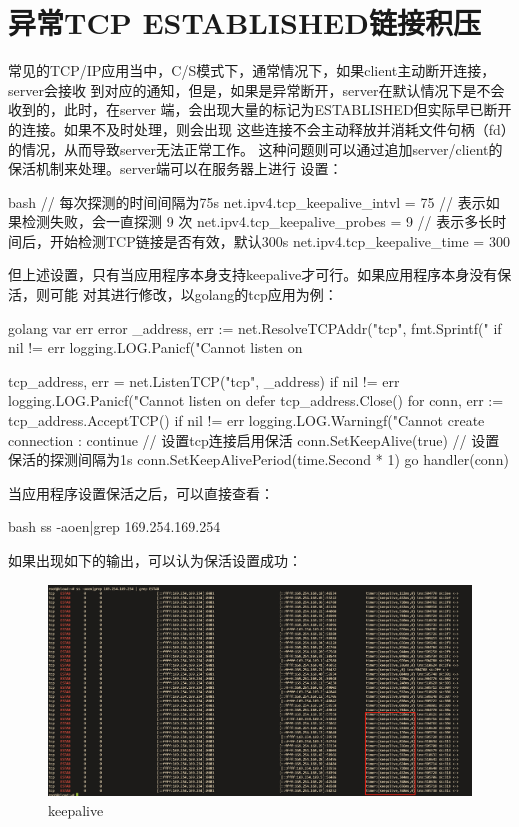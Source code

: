 \section{异常TCP ESTABLISHED链接积压}
常见的TCP/IP应用当中，C/S模式下，通常情况下，如果client主动断开连接，server会接收
到对应的通知，但是，如果是异常断开，server在默认情况下是不会收到的，此时，在server
端，会出现大量的标记为ESTABLISHED但实际早已断开的连接。如果不及时处理，则会出现
这些连接不会主动释放并消耗文件句柄（fd）的情况，从而导致server无法正常工作。
这种问题则可以通过追加server/client的保活机制来处理。server端可以在服务器上进行
设置：
\begin{code-block}{bash}
// 每次探测的时间间隔为75s
net.ipv4.tcp_keepalive_intvl = 75
// 表示如果检测失败，会一直探测 9 次
net.ipv4.tcp_keepalive_probes = 9
// 表示多长时间后，开始检测TCP链接是否有效，默认300s
net.ipv4.tcp_keepalive_time = 300
\end{code-block}
但上述设置，只有当应用程序本身支持keepalive才可行。如果应用程序本身没有保活，则可能
对其进行修改，以golang的tcp应用为例：
\begin{code-block}{golang}
var err error
_address, err := net.ResolveTCPAddr("tcp", fmt.Sprintf("%
if nil != err {
        logging.LOG.Panicf("Cannot listen on %
}

tcp_address, err = net.ListenTCP("tcp", _address)
if nil != err {
        logging.LOG.Panicf("Cannot listen on %
}
defer tcp_address.Close()
for {
        conn, err := tcp_address.AcceptTCP()
        if nil != err {
                logging.LOG.Warningf("Cannot create connection :%
                continue
        }
        // 设置tcp连接启用保活
        conn.SetKeepAlive(true)
        // 设置保活的探测间隔为1s
        conn.SetKeepAlivePeriod(time.Second * 1)
        go handler(conn)
}
\end{code-block}
当应用程序设置保活之后，可以直接查看：
\begin{code-block}{bash}
ss -aoen|grep 169.254.169.254
\end{code-block}
如果出现如下的输出，可以认为保活设置成功：
\begin{figure}[H]
  \centering
  \includegraphics[width=\linewidth]{keepalive.png}
  \caption{keepalive}
  \label{fig:keepalive}
\end{figure}
